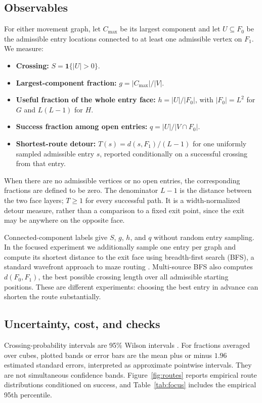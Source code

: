 \documentclass[11pt,letterpaper]{article}
\newcommand{\ind}{\mathbf{1}}
\begin{document}
\subsection{Observables}
For either movement graph, let $C_{\max}$ be its largest component and let
$U\subseteq F_0$ be the admissible entry locations connected to at least one
admissible vertex on $F_1$. We measure:
\begin{itemize}[leftmargin=1.3em,itemsep=2pt,topsep=3pt]
 \item \textbf{Crossing:} $S=\ind\{|U|>0\}$.
 \item \textbf{Largest-component fraction:} $g=|C_{\max}|/|V|$.
 \item \textbf{Useful fraction of the whole entry face:}
 $h=|U|/|F_0|$, with $|F_0|=L^2$ for $G$ and $L(L-1)$ for $H$.
 \item \textbf{Success fraction among open entries:}
 $q=|U|/|V\cap F_0|$.
 \item \textbf{Shortest-route detour:}
 $T(s)=d(s,F_1)/(L-1)$ for one uniformly sampled admissible entry $s$,
 reported conditionally on a successful crossing from that entry.
\end{itemize}
When there are no admissible vertices or no open entries, the corresponding
fractions are defined to be zero. The denominator $L-1$ is the distance between
the two face layers; $T\geq1$ for every successful path.
It is a width-normalized detour measure, rather than a comparison to a fixed
exit point, since the exit may be anywhere on the opposite face.

Connected-component labels give $S$, $g$, $h$, and $q$ without random entry
sampling. In the focused experiment we additionally sample one entry per graph
and compute its shortest distance to the exit face using breadth-first search
(BFS), a standard wavefront approach to maze routing \citep{lee1961}.
Multi-source BFS also computes $d(F_0,F_1)$, the best possible crossing length
over all admissible starting positions. These are different experiments:
choosing the best entry in advance can shorten the route substantially.

\subsection{Uncertainty, cost, and checks}
Crossing-probability intervals are 95\% Wilson intervals \citep{wilson1927}.
For fractions averaged over cubes, plotted bands or error bars are the mean
plus or minus $1.96$ estimated standard errors, interpreted as approximate
pointwise intervals. They are not simultaneous confidence bands.
Figure~\ref{fig:routes} reports empirical route distributions conditioned on
success, and Table~\ref{tab:focus} includes the empirical 95th percentile.
\end{document}
